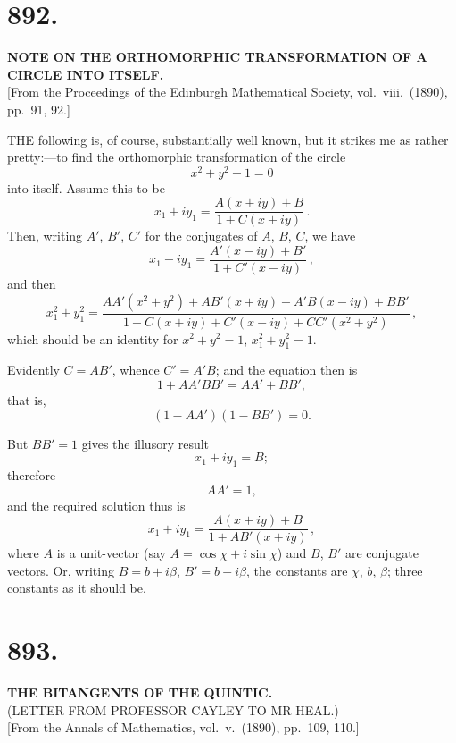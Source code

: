 \documentclass[11pt,a4paper]{article}
\begin{document}
\section*{892.}
\begin{center}
{\large\bfseries NOTE ON THE ORTHOMORPHIC TRANSFORMATION OF A CIRCLE INTO ITSELF.}\\[0.5em]
\small [From the Proceedings of the Edinburgh Mathematical Society, vol.\ viii.\ (1890), pp.\ 91, 92.]
\end{center}

THE following is, of course, substantially well known, but it strikes me as rather pretty:---to find the orthomorphic transformation of the circle
\[
x^2 + y^2 - 1 = 0
\]
into itself. Assume this to be
\[
x_1 + iy_1 = \frac{A(x + iy) + B}{1 + C(x + iy)}\,.
\]
Then, writing $A'$, $B'$, $C'$ for the conjugates of $A$, $B$, $C$, we have
\[
x_1 - iy_1 = \frac{A'(x - iy) + B'}{1 + C'(x - iy)}\,,
\]
and then
\[
x_1^2 + y_1^2 = \frac{AA'(x^2 + y^2) + AB'(x + iy) + A'B(x - iy) + BB'}{1 + C(x + iy) + C'(x - iy) + CC'(x^2 + y^2)}\,,
\]
which should be an identity for $x^2 + y^2 = 1$, $x_1^2 + y_1^2 = 1$.

Evidently $C = AB'$, whence $C' = A'B$; and the equation then is
\[
1 + AA'BB' = AA' + BB',
\]
that is,
\[
(1 - AA')(1 - BB') = 0.
\]

But $BB' = 1$ gives the illusory result
\[
x_1 + iy_1 = B;
\]
therefore
\[
AA' = 1,
\]
and the required solution thus is
\[
x_1 + iy_1 = \frac{A(x + iy) + B}{1 + AB'(x + iy)}\,,
\]
where $A$ is a unit-vector (say $A = \cos\chi + i\sin\chi$) and $B$, $B'$ are conjugate vectors. Or, writing $B = b + i\beta$, $B' = b - i\beta$, the constants are $\chi$, $b$, $\beta$; three constants as it should be.


\section*{893.}
\begin{center}
{\large\bfseries THE BITANGENTS OF THE QUINTIC.}\\[0.3em]
{\small (LETTER FROM PROFESSOR CAYLEY TO MR HEAL.)}\\[0.3em]
\small [From the Annals of Mathematics, vol.\ v.\ (1890), pp.\ 109, 110.]
\end{center}
\end{document}
